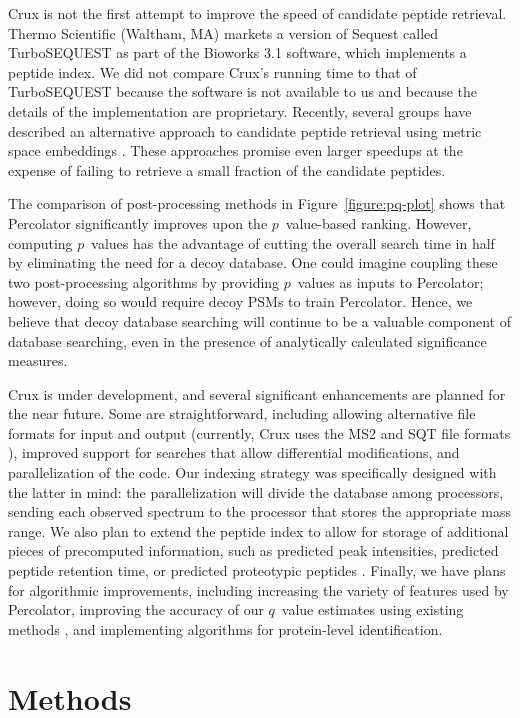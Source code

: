 \documentclass[12pt]{article}
\begin{document}
Crux is not the first attempt to improve the speed of candidate
peptide retrieval.  Thermo Scientific (Waltham, MA) markets a version
of {\sc Sequest} called TurboSEQUEST as part of the Bioworks 3.1
software, which implements a peptide index.  We did not compare Crux's
running time to that of TurboSEQUEST because the software is not
available to us and because the details of the implementation are
proprietary.  Recently, several groups have described an alternative
approach to candidate peptide retrieval using metric space embeddings
\cite{ramakrishnan:fast, dutta:speeding}.  These approaches promise
even larger speedups at the expense of failing to retrieve a small
fraction of the candidate peptides.

The comparison of post-processing methods in
Figure~\ref{figure:pq-plot} shows that Percolator significantly
improves upon the $p$~value-based ranking.  However, computing
$p$~values has the advantage of cutting the overall search time in
half by eliminating the need for a decoy database.  One could imagine
coupling these two post-processing algorithms by providing $p$~values
as inputs to Percolator; however, doing so would require decoy PSMs to
train Percolator.  Hence, we believe that decoy database searching
will continue to be a valuable component of database searching, even
in the presence of analytically calculated significance measures.

Crux is under development, and several significant enhancements are
planned for the near future.  Some are straightforward, including
allowing alternative file formats for input and output (currently,
Crux uses the MS2 and SQT file formats \cite{mcdonald:ms1}), improved
support for searches that allow differential modifications, and
parallelization of the code.  Our indexing strategy was specifically
designed with the latter in mind: the parallelization will divide the
database among processors, sending each observed spectrum to the
processor that stores the appropriate mass range.  We also plan to
extend the peptide index to allow for storage of additional pieces of
precomputed information, such as predicted peak intensities,
predicted peptide retention time, or predicted proteotypic peptides
\cite{mallick:computational}.  Finally, we have plans for algorithmic
improvements, including increasing the variety of features used by
Percolator, improving the accuracy of our $q$~value estimates using
existing methods \cite{storey:direct}, and implementing algorithms for
protein-level identification.

\section{Methods}
\end{document}
